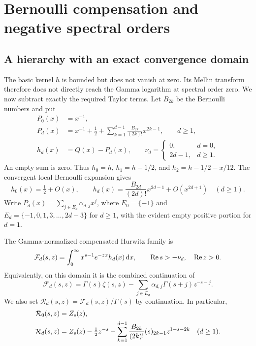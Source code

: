 \section{Bernoulli compensation and negative spectral orders}
\label{sec:compensation}

\subsection{A hierarchy with an exact convergence domain}
The basic kernel $h$ is bounded but does not vanish at zero. Its Mellin
transform therefore does not directly reach the Gamma logarithm at spectral
order zero. We now subtract exactly the required Taylor terms.
Let $B_{2k}$ be the Bernoulli numbers and put
\begin{align}
 P_0(x)&=x^{-1},\label{eq:P0}\\
 P_d(x)&=x^{-1}+\frac12+
       \sum_{k=1}^{d-1}\frac{B_{2k}}{(2k)!}x^{2k-1},\qquad d\ge1,
                 \label{eq:Pd}\\
 h_d(x)&=Q(x)-P_d(x),\qquad
 \nu_d=\begin{cases}0,&d=0,\\2d-1,&d\ge1.\end{cases}
                 \label{eq:hd}
\end{align}
An empty sum is zero. Thus $h_0=h$, $h_1=h-1/2$, and
$h_2=h-1/2-x/12$. The convergent local Bernoulli expansion gives
\begin{equation}\label{eq:hd-valuation}
 h_0(x)=\tfrac12+O(x),\qquad
 h_d(x)=\frac{B_{2d}}{(2d)!}x^{2d-1}+O(x^{2d+1})\quad(d\ge1).
\end{equation}
Write $P_d(x)=\sum_{j\in E_d}\alpha_{d,j}x^j$, where
$E_0=\{-1\}$ and
$E_d=\{-1,0,1,3,\ldots,2d-3\}$ for $d\ge1$, with the evident empty
positive portion for $d=1$.

\begin{definition}\label{def:Fd}
The Gamma-normalized compensated Hurwitz family is
\begin{equation}\label{eq:Fd-laplace}
 \mathcal F_d(s,z)=\int_0^\infty x^{s-1}e^{-zx}h_d(x)\,\mathrm d x,
 \qquad\operatorname{Re} s>-\nu_d,\quad\operatorname{Re} z>0.
\end{equation}
Equivalently, on this domain it is the combined continuation of
\begin{equation}\label{eq:Fd-closed}
 \mathcal F_d(s,z)=\Gamma(s)\zeta(s,z)
       -\sum_{j\in E_d}\alpha_{d,j}\Gamma(s+j)z^{-s-j}.
\end{equation}
We also set $\mathcal R_d(s,z)=\mathcal F_d(s,z)/\Gamma(s)$ by
continuation. In particular,
\begin{align}
 \mathcal R_0(s,z)&=Z_s(z),\notag\\
 \mathcal R_d(s,z)&=Z_s(z)-\tfrac12z^{-s}
  -\sum_{k=1}^{d-1}\frac{B_{2k}}{(2k)!}(s)_{2k-1}z^{1-s-2k}
          \quad(d\ge1).\label{eq:Rd}
\end{align}
\end{definition}

